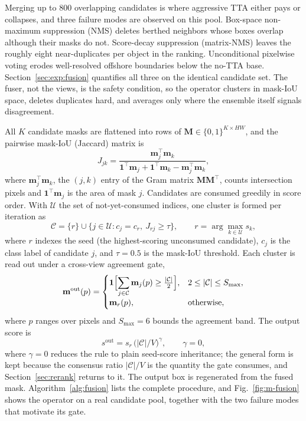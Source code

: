 Merging up to 800 overlapping candidates is where aggressive TTA either pays or collapses, and three failure modes are observed on this pool. Box-space non-maximum suppression (NMS) deletes berthed neighbors whose boxes overlap although their masks do not. Score-decay suppression (matrix-NMS) leaves the roughly eight near-duplicates per object in the ranking. Unconditional pixelwise voting erodes well-resolved offshore boundaries below the no-TTA base. Section~\ref{sec:exp:fusion} quantifies all three on the identical candidate set. The fuser, not the views, is the safety condition, so the operator clusters in mask-IoU space, deletes duplicates hard, and averages only where the ensemble itself signals disagreement.

All $K$ candidate masks are flattened into rows of $\mathbf{M}\in\{0,1\}^{K\times HW}$, and the pairwise mask-IoU (Jaccard) matrix is
\begin{equation}\label{eq:iou}
J_{jk}=\frac{\mathbf{m}_j^{\top}\mathbf{m}_k}
{\mathbf{1}^{\top}\mathbf{m}_j+\mathbf{1}^{\top}\mathbf{m}_k-\mathbf{m}_j^{\top}\mathbf{m}_k},
\end{equation}
where $\mathbf{m}_j^{\top}\mathbf{m}_k$, the $(j,k)$ entry of the Gram matrix $\mathbf{M}\mathbf{M}^{\top}$, counts intersection pixels and $\mathbf{1}^{\top}\mathbf{m}_j$ is the area of mask $j$. Candidates are consumed greedily in score order. With $\mathcal{U}$ the set of not-yet-consumed indices, one cluster is formed per iteration as
\begin{equation}\label{eq:cluster}
\mathcal{C}=\{r\}\cup\bigl\{j\in\mathcal{U}: c_j=c_r,\ J_{rj}\ge\tau\bigr\},
\qquad r=\arg\max_{k\in\mathcal{U}}s_k,
\end{equation}
where $r$ indexes the seed (the highest-scoring unconsumed candidate), $c_j$ is the class label of candidate $j$, and $\tau=0.5$ is the mask-IoU threshold. Each cluster is read out under a cross-view agreement gate,
\begin{equation}\label{eq:fuse}
\mathbf{m}^{\mathrm{out}}(p)=
\begin{cases}
\mathbf{1}\Bigl[\displaystyle\sum_{j\in\mathcal{C}}\mathbf{m}_j(p)\ge\tfrac{|\mathcal{C}|}{2}\Bigr],
& 2\le|\mathcal{C}|\le S_{\max},\\[8pt]
\mathbf{m}_r(p), & \text{otherwise},
\end{cases}
\end{equation}
where $p$ ranges over pixels and $S_{\max}=6$ bounds the agreement band. The output score is
\begin{equation}\label{eq:score}
s^{\mathrm{out}}=s_r\,\bigl(|\mathcal{C}|/V\bigr)^{\gamma},
\qquad \gamma=0,
\end{equation}
where $\gamma=0$ reduces the rule to plain seed-score inheritance; the general form is kept because the consensus ratio $|\mathcal{C}|/V$ is the quantity the gate consumes, and Section~\ref{sec:rerank} returns to it. The output box is regenerated from the fused mask. Algorithm~\ref{alg:fusion} lists the complete procedure, and Fig.~\ref{fig:m-fusion} shows the operator on a real candidate pool, together with the two failure modes that motivate its gate.

